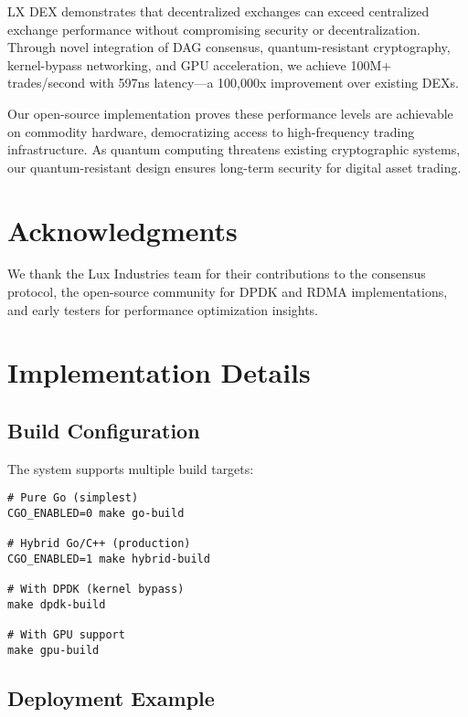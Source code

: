 \documentclass[11pt,a4paper]{article}
\newcommand{\lxdex}{\textsc{LX DEX}}
\begin{document}
\lxdex{} demonstrates that decentralized exchanges can exceed centralized exchange performance without compromising security or decentralization. Through novel integration of DAG consensus, quantum-resistant cryptography, kernel-bypass networking, and GPU acceleration, we achieve 100M+ trades/second with 597ns latency—a 100,000x improvement over existing DEXs.

Our open-source implementation proves these performance levels are achievable on commodity hardware, democratizing access to high-frequency trading infrastructure. As quantum computing threatens existing cryptographic systems, our quantum-resistant design ensures long-term security for digital asset trading.

\section*{Acknowledgments}

We thank the Lux Industries team for their contributions to the consensus protocol, the open-source community for DPDK and RDMA implementations, and early testers for performance optimization insights.




\appendix

\section{Implementation Details}

\subsection{Build Configuration}

The system supports multiple build targets:

\begin{lstlisting}
# Pure Go (simplest)
CGO_ENABLED=0 make go-build

# Hybrid Go/C++ (production)
CGO_ENABLED=1 make hybrid-build

# With DPDK (kernel bypass)
make dpdk-build

# With GPU support
make gpu-build
\end{lstlisting}

\subsection{Deployment Example}
\end{document}

